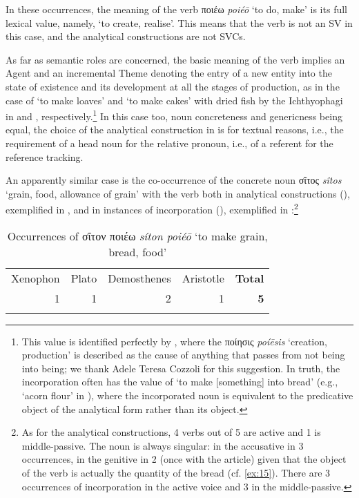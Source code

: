 \documentclass[output=paper,colorlinks,citecolor=brown]{langscibook}
\begin{document}
In these occurrences, the meaning of the verb ποιέω \textit{poiéō} `to do, make' is its full lexical value, namely, `to create, realise'. This means that the verb is not an SV in this case, and the analytical constructions are not SVCs. 


As far as semantic roles are concerned, the basic meaning of the verb implies an Agent and an incremental Theme denoting the entry of a new entity into the state of existence and its development at all the stages of production, as in the case of `to make loaves' and `to make cakes' with dried fish by the Ichthyophagi in  and , respectively.\footnote{This value is identified perfectly by , where the ποίησις \textit{poíēsis} `creation, production' is described as the cause of anything that passes from not being into being; we thank Adele Teresa Cozzoli for this suggestion. In truth, the incorporation often has the value of `to make [something] into bread' (e.g., `acorn flour' in ), where the incorporated noun is equivalent to the predicative object of the analytical form rather than its object.} In this case too, noun concreteness and genericness being equal, the choice of the analytical construction in  is for textual reasons, i.e., the requirement of a head noun for the relative pronoun, i.e., of a referent for the reference tracking.

An apparently similar case is the co-occurrence of the concrete noun σῖτος \textit{sîtos} `grain, food, allowance of grain' with the verb both in analytical constructions (), exemplified in , and in instances of incorporation (), exemplified in :\footnote{As for the analytical constructions, 4 verbs out of 5 are active and 1 is middle-passive. The noun is always singular: in the accusative in 3 occurrences, in the genitive in 2 (once with the article) given that the object of the verb is actually the quantity of the bread (cf. \ref{ex:15}). There are 3 occurrences of incorporation in the active voice and 3 in the middle-passive.}


\begin{table}
	\caption{Occurrences of σῖτον ποιέω \textit{síton poiéō} `to make grain, bread, food'}
	\label{tab:E:occurrences-siton-poieo}
	\begin{tabular}{rrrrr}
    \lsptoprule
		Xenophon & Plato & Demosthenes & Aristotle & \textbf{Total} \\
		1  & 1   & 2  & 1      & \textbf{5}   \\
    \lspbottomrule
	\end{tabular}
\end{table}
\end{document}
